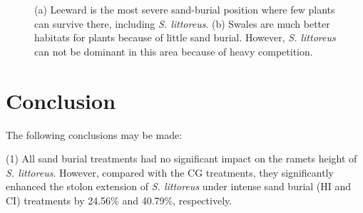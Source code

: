 \documentclass[]{interact}
\theoremstyle{plain}%
\theoremstyle{definition}
\theoremstyle{remark}
\begin{document}
\begin{figure}
  \centering
  \hspace{5pt}
  \caption{(a) Leeward is the most severe sand-burial position where few plants can survive there, including \textit{S. littoreus}. (b) Swales are much better habitats for plants because of little sand burial. However, \textit{S. littoreus} can not be dominant in this area because of heavy competition.} 
  \label{fig:leeward_swale}
\end{figure}

\section{Conclusion}
The following conclusions may be made:

(1) All sand burial treatments had no significant impact on the 
ramets height of \textit{S. littoreus}. However, compared with the CG treatments, they significantly enhanced the stolon extension of \textit{S. littoreus} under intense sand burial (HI and CI) treatments by 24.56\% and 40.79\%, respectively.
\end{document}
